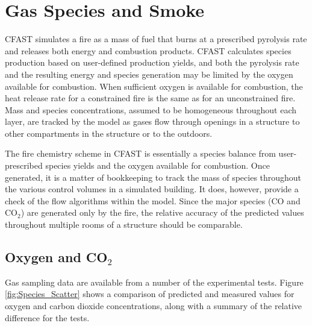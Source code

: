 \chapter{Gas Species and Smoke}

CFAST simulates a fire as a mass of fuel that burns at a prescribed pyrolysis rate and releases both energy and combustion products.  CFAST calculates species production based on user-defined production yields, and both the pyrolysis rate and the resulting energy and species generation may be limited by the oxygen available for combustion.  When sufficient oxygen is available for combustion, the heat release rate for a constrained fire is the same as for an unconstrained fire.  Mass and species concentrations, assumed to be homogeneous throughout each layer, are tracked by the model as gases flow through openings in a structure to other compartments in the structure or to the outdoors.

The fire chemistry scheme in CFAST is essentially a species balance from user-prescribed 
species yields and the oxygen available for combustion.  Once generated, it is a matter of 
bookkeeping to track the mass of species throughout the various control volumes in a simulated 
building.  It does, however, provide a check of the flow algorithms within the model. 
Since the major species (CO and CO$_2$) are generated only by the fire, the relative accuracy of the 
predicted values throughout multiple rooms of a structure should be comparable. 

\section{Oxygen and CO$_2$}

Gas sampling data are available from a number of the experimental tests.  Figure \ref{fig:Species_Scatter} shows a comparison of predicted and measured values for oxygen and carbon dioxide concentrations, along with a summary of the relative difference for the tests.

